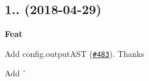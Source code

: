 \subsection*{1.. (2018-\/04-\/29)}


\begin{DoxyItemize}
\item {\bfseries Feat}
\begin{DoxyItemize}
\item Add {\ttfamily config.\+output\+A\+ST} (\href{https://github.com/esdoc/esdoc/pull/483}{\tt \#483}). Thanks \href{https://github.com/MattMcFarland}{\tt }
\item Add \`{} 
\end{DoxyItemize}
\end{DoxyItemize}
